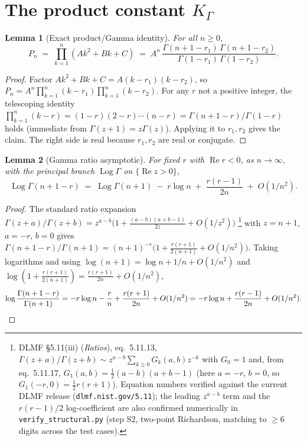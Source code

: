 \documentclass[11pt]{article}
\newtheorem{lemma}{Lemma}
\begin{document}
\section{The product constant $K_\Gamma$}

\begin{lemma}[Exact product/Gamma identity]\label{lem:prod}
For all $n\ge0$,
\[
  P_n \;=\; \prod_{k=1}^n (Ak^2+Bk+C)
       \;=\; A^n\,
         \frac{\Gamma(n+1-r_1)\,\Gamma(n+1-r_2)}
              {\Gamma(1-r_1)\,\Gamma(1-r_2)} .
\]
\end{lemma}

\begin{proof}
Factor $Ak^2+Bk+C=A(k-r_1)(k-r_2)$, so
$P_n=A^n\prod_{k=1}^n(k-r_1)\prod_{k=1}^n(k-r_2)$. For any $r$ not a positive
integer, the telescoping identity
$\prod_{k=1}^n(k-r)=(1-r)(2-r)\cdots(n-r)=\Gamma(n+1-r)/\Gamma(1-r)$
holds (immediate from $\Gamma(z+1)=z\Gamma(z)$). Applying it to $r_1,r_2$ gives the
claim. The right side is real because $r_1,r_2$ are real or conjugate.
\end{proof}

\begin{lemma}[Gamma ratio asymptotic]\label{lem:ratio}
For fixed $r$ with $\operatorname{Re}r<0$, as $n\to\infty$, with the principal
branch $\operatorname{Log}\Gamma$ on $\{\operatorname{Re}z>0\}$,
\[
  \operatorname{Log}\Gamma(n+1-r) \;=\; \operatorname{Log}\Gamma(n+1) \;-\; r\log n
        \;+\; \frac{r(r-1)}{2n} \;+\; O(1/n^2).
\]
\end{lemma}

\begin{proof}
The standard ratio expansion
$\Gamma(z+a)/\Gamma(z+b)=z^{a-b}\big(1+\tfrac{(a-b)(a+b-1)}{2z}+O(1/z^2)\big)$%
\footnote{DLMF \S5.11(iii) (\emph{Ratios}), eq.~5.11.13,
$\Gamma(z+a)/\Gamma(z+b)\sim z^{a-b}\sum_{k\ge0}G_k(a,b)z^{-k}$ with $G_0=1$ and,
from eq.~5.11.17, $G_1(a,b)=\tfrac12(a-b)(a+b-1)$ (here $a=-r$, $b=0$, so
$G_1(-r,0)=\tfrac12 r(r+1)$). Equation numbers verified against the current DLMF
release (\texttt{dlmf.nist.gov/5.11}); the leading $z^{a-b}$ term and the
$r(r-1)/2$ log-coefficient are also confirmed numerically in
\texttt{verify\_structural.py} (step S2, two-point Richardson, matching to
$\ge6$ digits across the test cases).}
with $z=n+1$, $a=-r$, $b=0$ gives
$\Gamma(n+1-r)/\Gamma(n+1)=(n+1)^{-r}\big(1+\tfrac{r(r+1)}{2(n+1)}+O(1/n^2)\big)$.
Taking logarithms and using $\log(n+1)=\log n+1/n+O(1/n^2)$ and
$\log(1+\tfrac{r(r+1)}{2(n+1)})=\tfrac{r(r+1)}{2n}+O(1/n^2)$,
\[
  \log\frac{\Gamma(n+1-r)}{\Gamma(n+1)}
   = -r\log n -\frac{r}{n}+\frac{r(r+1)}{2n}+O(1/n^2)
   = -r\log n + \frac{r(r-1)}{2n}+O(1/n^2). \qedhere
\]
\end{proof}
\end{document}

